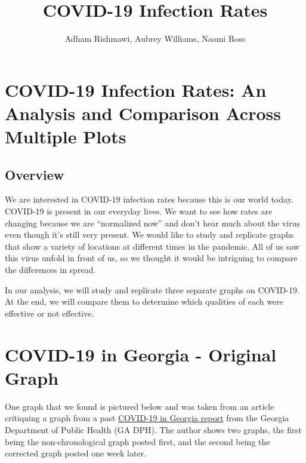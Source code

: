 \documentclass[
]{article}
\title{COVID-19 Infection Rates}
\author{Adham Rishmawi, Aubrey Williams, Naomi Ross}
\date{}
\begin{document}
\maketitle

\hypertarget{covid-19-infection-rates-an-analysis-and-comparison-across-multiple-plots}{%
\section{COVID-19 Infection Rates: An Analysis and Comparison Across
Multiple
Plots}\label{covid-19-infection-rates-an-analysis-and-comparison-across-multiple-plots}}

\hypertarget{overview}{%
\subsection{Overview}\label{overview}}

We are interested in COVID-19 infection rates because this is our world
today. COVID-19 is present in our everyday lives. We want to see how
rates are changing because we are ``normalized now'' and don't hear much
about the virus even though it's still very present. We would like to
study and replicate graphs that show a variety of locations at different
times in the pandemic. All of us saw this virus unfold in front of us,
so we thought it would be intriguing to compare the differences in
spread.

In our analysis, we will study and replicate three separate graphs on
COVID-19. At the end, we will compare them to determine which qualities
of each were effective or not effective.

\hypertarget{covid-19-in-georgia---original-graph}{%
\section{COVID-19 in Georgia - Original
Graph}\label{covid-19-in-georgia---original-graph}}

One graph that we found is pictured below and was taken from an article
critiquing a graph from a past
\href{https://www.covid-georgia.com/archive/did-georgia-graph-cases-with-the-dates-out-of-order/}{COVID-19
in Georgia report} from the Georgia Department of Public Health (GA
DPH). The author shows two graphs, the first being the non-chronological
graph posted first, and the second being the corrected graph posted one
week later.
\end{document}
